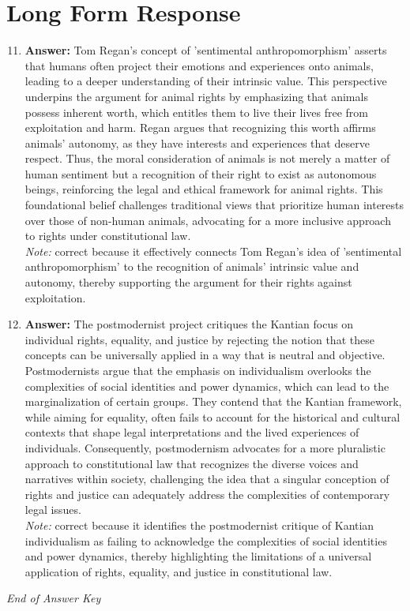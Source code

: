 \documentclass[12pt]{article}
\begin{document}
\section*{Long Form Response}
\begin{enumerate}[label=\arabic*.]
\setcounter{enumi}{10}
\item \textbf{Answer:} Tom Regan's concept of 'sentimental anthropomorphism' asserts that humans often project their emotions and experiences onto animals, leading to a deeper understanding of their intrinsic value. This perspective underpins the argument for animal rights by emphasizing that animals possess inherent worth, which entitles them to live their lives free from exploitation and harm. Regan argues that recognizing this worth affirms animals' autonomy, as they have interests and experiences that deserve respect. Thus, the moral consideration of animals is not merely a matter of human sentiment but a recognition of their right to exist as autonomous beings, reinforcing the legal and ethical framework for animal rights. This foundational belief challenges traditional views that prioritize human interests over those of non-human animals, advocating for a more inclusive approach to rights under constitutional law.
\\ \textit{Note:} correct because it effectively connects Tom Regan's idea of 'sentimental anthropomorphism' to the recognition of animals' intrinsic value and autonomy, thereby supporting the argument for their rights against exploitation.
\item \textbf{Answer:} The postmodernist project critiques the Kantian focus on individual rights, equality, and justice by rejecting the notion that these concepts can be universally applied in a way that is neutral and objective. Postmodernists argue that the emphasis on individualism overlooks the complexities of social identities and power dynamics, which can lead to the marginalization of certain groups. They contend that the Kantian framework, while aiming for equality, often fails to account for the historical and cultural contexts that shape legal interpretations and the lived experiences of individuals. Consequently, postmodernism advocates for a more pluralistic approach to constitutional law that recognizes the diverse voices and narratives within society, challenging the idea that a singular conception of rights and justice can adequately address the complexities of contemporary legal issues.
\\ \textit{Note:} correct because it identifies the postmodernist critique of Kantian individualism as failing to acknowledge the complexities of social identities and power dynamics, thereby highlighting the limitations of a universal application of rights, equality, and justice in constitutional law.
\end{enumerate}

\vfill
\noindent\textit{End of Answer Key}
\end{document}
